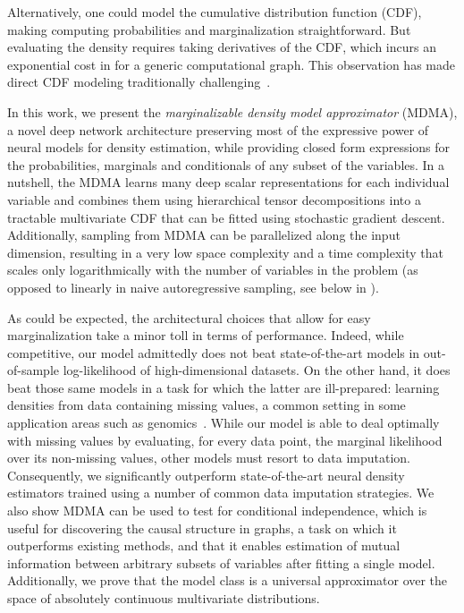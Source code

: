\documentclass{article}
\begin{document}
Alternatively, one could model the cumulative distribution function (CDF), making computing probabilities and marginalization straightforward. But evaluating the density requires taking  derivatives of the CDF, which incurs an exponential cost in  for a generic computational graph.
This observation has made direct CDF modeling traditionally challenging~\cite{chilinski2020neural}.

In this work, we present the \emph{marginalizable density model approximator} (MDMA), a novel deep network architecture preserving most of the expressive power of neural models for density estimation, while  providing closed form expressions for the probabilities, marginals and conditionals of any subset of the variables.
In a nutshell, the MDMA learns many deep 
scalar representations for each individual variable 
and combines them using hierarchical tensor decompositions \cite{hackbusch2012tensor,cichocki2016tensor} into a tractable multivariate CDF that can be fitted using stochastic gradient descent.
Additionally, sampling from MDMA can be parallelized along the input dimension, resulting in 
a very low space complexity and a time complexity that scales only logarithmically with the number of variables in the problem (as opposed to linearly in naive autoregressive sampling, see below in ). 


As could be expected, the architectural choices that allow for easy marginalization take  a minor toll  in terms of performance. Indeed, while competitive, our model admittedly does not beat  state-of-the-art models in out-of-sample log-likelihood of 
high-dimensional datasets. On the other hand, it does 
beat those same models in a task for which the latter are ill-prepared: learning densities from data containing missing values, a
common setting in some application areas such as genomics~\cite{li2009genotype, marchini2010genotype}. 
While our model is able to deal optimally with missing values by evaluating, for every data point,  the marginal likelihood over its non-missing values, other models must resort to data
imputation. Consequently, we significantly outperform state-of-the-art neural density estimators trained 
using a number of common data imputation strategies. We also show MDMA can be used to test for conditional independence, which is useful for discovering the causal structure in graphs, a task on which it outperforms existing methods, and that it enables estimation of mutual information between arbitrary subsets of variables after fitting a single model. Additionally, we prove that the model class is a universal approximator over the space of absolutely continuous multivariate distributions. 
\end{document}
